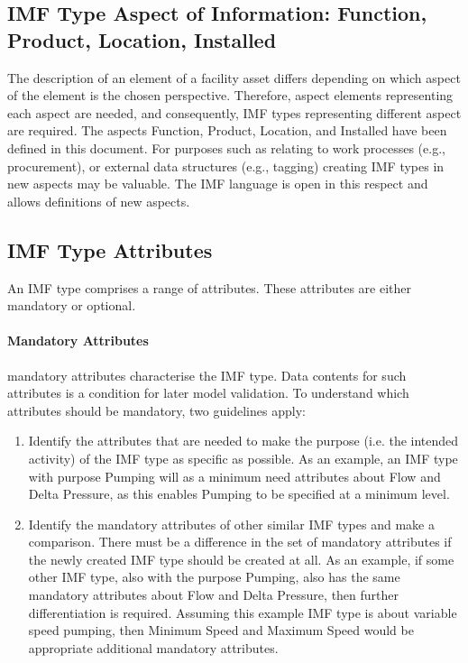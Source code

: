 \documentclass[../main.tex]{subfiles}
\begin{document}
\subsection{IMF Type Aspect of  Information: Function, Product, Location, Installed}
The description of an element of a facility asset differs depending on which aspect of the element is the chosen perspective. Therefore, aspect elements representing each aspect are needed, and consequently,
IMF types representing different aspect are required. The aspects Function, Product, Location, and Installed have been defined in this document. For purposes such as relating to work processes (e.g., procurement), or external data structures (e.g., tagging) creating IMF types in new aspects may be valuable. The IMF language is open in this respect and allows definitions of new aspects.

\subsection{IMF Type Attributes}

An IMF type comprises a range of attributes. These attributes are either mandatory or optional.

\paragraph{Mandatory Attributes} mandatory attributes characterise the IMF type. Data contents for such attributes is a condition for later model validation. To understand which attributes should be mandatory, two guidelines apply:
\begin{enumerate}
\item Identify the attributes that are needed to make the purpose (i.e. the intended activity) of the IMF type as specific as possible.  As an example, an IMF type with purpose Pumping will as a minimum need attributes about Flow and Delta Pressure, as this enables Pumping to be specified at a minimum level.
\item Identify the mandatory attributes of other similar IMF types and make a comparison. There must be a difference in the set of mandatory attributes if the newly created IMF type should be created at all. As an example, if some other IMF type, also with the purpose Pumping, also has the same mandatory attributes about Flow and Delta Pressure, then further differentiation is required. Assuming this example IMF type is about variable speed pumping, then Minimum Speed and Maximum Speed would be appropriate additional mandatory attributes.
\end{enumerate}
\end{document}

